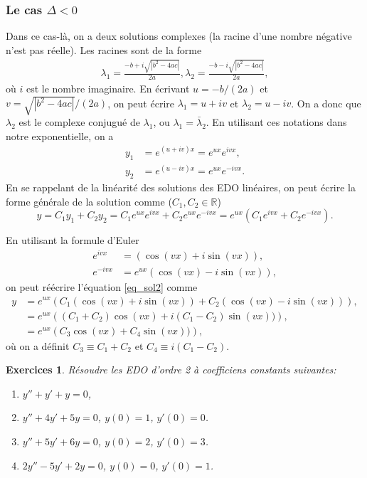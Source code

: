 \documentclass[a4paper,12pt]{book}
\newcommand{\real}{\mathbb{R}}
\newtheorem*{exercices}{Exercices}
\begin{document}
\subsubsection{Le cas $\Delta<0$}
Dans ce cas-là, on a deux solutions complexes (la racine d'une nombre négative 
n'est pas réelle). Les racines sont de la forme
\begin{align}
 \lambda_1=\frac{-b+i\sqrt{|b^2-4ac|}}{2a},
 \lambda_2=\frac{-b-i\sqrt{|b^2-4ac|}}{2a},
\end{align}
où $i$ est le nombre imaginaire. En écrivant $u=-b/(2a)$ et $v=\sqrt{|b^2-4ac|}/(2a)$, on peut écrire $\lambda_1=u+iv$ et $\lambda_2=u-iv$. On a donc que 
$\lambda_2$ est le complexe conjugué de $\lambda_1$, ou $\lambda_1=\bar{\lambda}_2$. En utilisant ces notations dans 
notre exponentielle, on a 
\begin{align}
 y_1&=e^{(u+iv)x}=e^{ux}e^{ivx},\\
 y_2&=e^{(u-iv)x}=e^{ux}e^{-ivx}.
\end{align}
En se rappelant de la linéarité des solutions des EDO linéaires, 
on peut écrire la forme générale de la solution comme ($C_1,C_2\in \real$)
\begin{equation}
 y=C_1y_1+C_2y_2=C_1e^{ux}e^{ivx}+C_2e^{ux}e^{-ivx}=e^{ux}(C_1e^{ivx}+C_2e^{-ivx}).\label{eq_sol2}
\end{equation}

En utilisant la formule d'Euler
\begin{align}
 e^{ivx}&=(\cos(vx)+i\sin(vx)),\\
 e^{-ivx}&=e^{ux}(\cos(vx)-i\sin(vx)),
\end{align}
on peut réécrire l'équation \eqref{eq_sol2} comme
\begin{align}
 y&=e^{ux}\left(C_1(\cos(vx)+i\sin(vx))+C_2(\cos(vx)-i\sin(vx))\right),\nonumber\\
 &=e^{ux}\left((C_1+C_2)\cos(vx)+i(C_1-C_2)\sin(vx))\right),\nonumber\\
 &=e^{ux}\left(C_3\cos(vx)+C_4\sin(vx))\right),
\end{align}
où on a définit $C_3\equiv C_1+C_2$ et $C_4\equiv i(C_1-C_2)$.

\begin{exercices}
Résoudre les EDO d'ordre 2 à coefficiens constants suivantes:
 \begin{enumerate}
  \item $y''+y'+y=0$,
  \item $y''+4y'+5y=0$, $y(0)=1$, $y'(0)=0$.
  \item $y''+5y'+6y=0$, $y(0)=2$, $y'(0)=3$.
  \item $2y''-5y'+2y=0$, $y(0)=0$, $y'(0)=1$.
 \end{enumerate}

\end{exercices}
\end{document}

